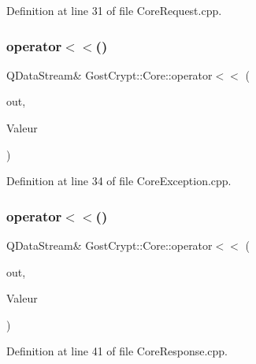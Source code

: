 Definition at line 31 of file Core\+Request.\+cpp.

\mbox{\label{namespace_gost_crypt_1_1_core_af862fa26ba84703c0ac089d1250db141}} 
\subsubsection{\texorpdfstring{operator$<$$<$()}{operator<<()}\hspace{0.1cm}{\footnotesize\ttfamily [3/56]}}
{\footnotesize\ttfamily Q\+Data\+Stream\& Gost\+Crypt\+::\+Core\+::operator$<$$<$ (\begin{DoxyParamCaption}\item[{Q\+Data\+Stream \&}]{out,  }\item[{const \hyperlink{class_gost_crypt_1_1_core_1_1_core_exception}{Gost\+Crypt\+::\+Core\+::\+Core\+Exception} \&}]{Valeur }\end{DoxyParamCaption})}



Definition at line 34 of file Core\+Exception.\+cpp.

\mbox{\label{namespace_gost_crypt_1_1_core_ae79ccf0215c9beb4e8ef84f76a54653d}} 
\subsubsection{\texorpdfstring{operator$<$$<$()}{operator<<()}\hspace{0.1cm}{\footnotesize\ttfamily [4/56]}}
{\footnotesize\ttfamily Q\+Data\+Stream\& Gost\+Crypt\+::\+Core\+::operator$<$$<$ (\begin{DoxyParamCaption}\item[{Q\+Data\+Stream \&}]{out,  }\item[{const \hyperlink{struct_gost_crypt_1_1_core_1_1_create_volume_response}{Create\+Volume\+Response} \&}]{Valeur }\end{DoxyParamCaption})}



Definition at line 41 of file Core\+Response.\+cpp.


